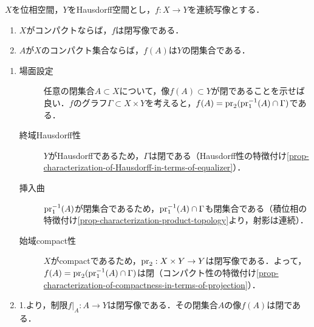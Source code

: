 \documentclass[uplatex,dvipdfmx]{jsreport}
\begin{document}
\begin{proposition}[閉写像補題]\label{prop-continuous-map-from-compact-to-Hausdorff}
    $X$を位相空間，$Y$をHausdorff空間とし，$f:X\to Y$を連続写像とする．
    \begin{enumerate}
        \item $X$がコンパクトならば，$f$は閉写像である．
        \item $A$が$X$のコンパクト集合ならば，$f(A)$は$Y$の閉集合である．
    \end{enumerate}
\end{proposition}
\begin{Proof}\mbox{}
    \begin{enumerate}
        \item \begin{description}
            \item[場面設定] 任意の閉集合$A\subset X$について，像$f(A)\subset Y$が閉であることを示せば良い．$f$のグラフ$\Gamma\subset X\times Y$を考えると，$f(A)=\mathrm{pr}_2(\mathrm{pr}_1^{-1}(A)\cap\Gamma)$である．
            \item[終域Hausdorff性] $Y$がHausdorffであるため，$\Gamma$は閉である（Hausdorff性の特徴付け\ref{prop-characterization-of-Hausdorff-in-terms-of-equalizer}）．
            \item[挿入曲] $\mathrm{pr}_1^{-1}(A)$が閉集合であるため，$\mathrm{pr}_1^{-1}(A)\cap\Gamma$も閉集合である（積位相の特徴付け\ref{prop-characterization-product-topology}より，射影は連続）．
            \item[始域compact性] $X$がcompactであるため，$\mathrm{pr}_2:X\times Y\to Y$は閉写像である．よって，$f(A)=\mathrm{pr}_2(\mathrm{pr}_1^{-1}(A)\cap\Gamma)$は閉（コンパクト性の特徴付け\ref{prop-characterization-of-compactness-in-terms-of-projection}）．
        \end{description}
        \item 
        1.より，制限$f|_A:A\to Y$は閉写像である．その閉集合$A$の像$f(A)$は閉である．
    \end{enumerate}
\end{Proof}
\end{document}

